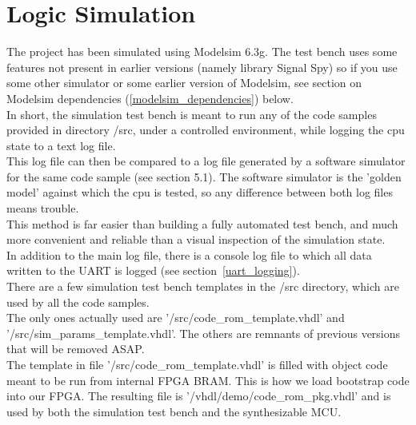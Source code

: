 \chapter{Logic Simulation}
\label{logic_simulation}

    The project has been simulated using Modelsim 6.3g. The test bench
    uses some features not present in earlier versions (namely library Signal 
    Spy) so if you use some other simulator or some earlier version of Modelsim, 
    see section on Modelsim dependencies (\ref{modelsim_dependencies}) below.\\

    In short, the simulation test bench is meant to run any of the code samples
    provided in directory /src, under a controlled environment, while logging
    the cpu state to a text log file.\\

    This log file can then be compared to a log file generated by a software
    simulator for the same code sample (see section 5.1). The software
    simulator is the 'golden model' against which the cpu is tested, so any
    difference between both log files means trouble.\\

    This method is far easier than building a fully automated test bench, and
    much more convenient and reliable than a visual inspection of the simulation
    state.\\
    
    In addition to the main log file, there is a console log file to which all 
    data written to the UART is logged (see section~\ref{uart_logging}).\\

    There are a few simulation test bench templates in the /src directory, which 
    are used by all the code samples.\\
    The only ones actually used are '/src/code\_rom\_template.vhdl' and 
    '/src/sim\_params\_template.vhdl'. The others
    are remnants of previous versions that will be removed ASAP.\\
    
    The template in file '/src/code\_rom\_template.vhdl' is filled with object
    code meant to be run from internal FPGA BRAM. This is how we load bootstrap
    code into our FPGA. The resulting file is '/vhdl/demo/code\_rom\_pkg.vhdl'
    and is used by both the simulation test bench and the synthesizable MCU.\\
    
